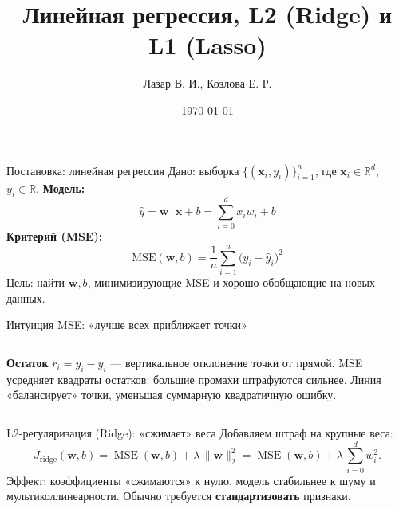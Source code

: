 \documentclass[11pt,aspectratio=169]{beamer}
\title{Линейная регрессия, L2 (Ridge) и L1 (Lasso)}
\author{Лазар В. И., Козлова Е. Р.}
\date{\today}
\begin{document}
\begin{frame}
	\titlepage
\end{frame}


\begin{frame}{Постановка: линейная регрессия}
	\small
	Дано: выборка $\{(\mathbf x_i, y_i)\}_{i=1}^n$, где $\mathbf x_i\in\mathbb R^d$, $y_i\in\mathbb R$.
	\textbf{Модель:}
	\begin{equation*}
		\hat y = \mathbf w^\top \mathbf x + b = \sum_{i=0}^{d} x_i w_i + b
	\end{equation*}
	\textbf{Критерий (MSE):}
	\begin{equation*}
		\mathrm{MSE}(\mathbf w,b)=\frac{1}{n}\sum_{i=1}^n\bigl(y_i- \hat{y}_i \bigr)^2
	\end{equation*}
	Цель: найти $\mathbf w,b$, минимизирующие MSE и хорошо обобщающие на новых данных.
\end{frame}

\begin{frame}{Интуиция MSE: «лучше всех приближает точки»}
	\begin{columns}
		\small
		\textbf{Остаток} $r_i = y_i-\hat y_i$ — вертикальное отклонение точки от прямой.
		MSE усредняет квадраты остатков: большие промахи штрафуются сильнее.
		Линия «балансирует» точки, уменьшая суммарную квадратичную ошибку.
	\end{columns}
\end{frame}

\begin{frame}{L2-регуляризация (Ridge): «сжимает» веса}
	\small
	Добавляем штраф на крупные веса:
	\[
		J_{\text{ridge}}(\mathbf w,b)=\operatorname{MSE}(\mathbf w,b) + \lambda\,\lVert\mathbf w\rVert_2^2 = \operatorname{MSE}(\mathbf w,b) + \lambda\,\sum_{i=0}^{d} w_{i}^2.
	\]
	Эффект: коэффициенты «сжимаются» к нулю, модель стабильнее к шуму и мультиколлинеарности. Обычно требуется \textbf{стандартизовать} признаки.
\end{frame}
\end{document}
